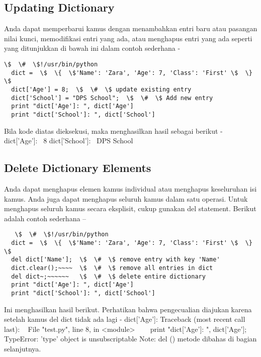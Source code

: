 \subsection{Updating Dictionary}
Anda dapat memperbarui kamus dengan menambahkan entri baru atau pasangan nilai kunci, memodifikasi entri yang ada, atau menghapus entri yang ada seperti yang ditunjukkan di bawah ini dalam contoh sederhana -
\begin{verbatim}
\$  \#  \$!/usr/bin/python 
  dict =  \$  \{  \$'Name': 'Zara', 'Age': 7, 'Class': 'First' \$  \}  \$ 
  dict['Age'] = 8;  \$  \#  \$ update existing entry
  dict['School'] = "DPS School";  \$  \#  \$ Add new entry
  print "dict['Age']: ", dict['Age']
  print "dict['School']: ", dict['School']
\end{verbatim}
Bila kode diatas dieksekusi, maka menghasilkan hasil sebagai berikut - 
  dict['Age']:~ 8 
  dict['School']:~ DPS School 
  
\subsection{Delete Dictionary Elements}
Anda dapat menghapus elemen kamus individual atau menghapus keseluruhan isi kamus. Anda juga dapat menghapus seluruh kamus dalam satu operasi. 
Untuk menghapus seluruh kamus secara eksplisit, cukup gunakan del statement. Berikut adalah contoh sederhana – 
\begin{verbatim}   
   \$  \#  \$!/usr/bin/python
  dict =  \$  \{  \$'Name': 'Zara', 'Age': 7, 'Class': 'First' \$  \}  \$
  del dict['Name'];  \$  \#  \$ remove entry with key 'Name'
  dict.clear();~~~~  \$  \#  \$ remove all entries in dict 
  del dict~;~~~~~~   \$  \#  \$ delete entire dictionary 
  print "dict['Age']: ", dict['Age'] 
  print "dict['School']: ", dict['School']
\end{verbatim}  
Ini menghasilkan hasil berikut. Perhatikan bahwa pengecualian diajukan karena setelah kamus del dict tidak ada lagi - 
  dict['Age']: 
  Traceback (most recent call last): 
~   File "test.py", line 8, in <module> 
~~~     print "dict['Age']: ", dict['Age']; 
  TypeError: 'type' object is unsubscriptable 
Note: del () metode dibahas di bagian selanjutnya. 

